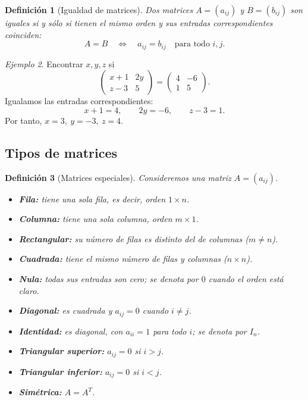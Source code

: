 \documentclass[12pt]{article}
\newtheorem{definicion}{Definición}[section]
\theoremstyle{remark}
\newtheorem{ejemplo}[definicion]{Ejemplo}
\begin{document}
\begin{definicion}[Igualdad de matrices]
Dos matrices $A=(a_{ij})$ y $B=(b_{ij})$ son iguales si y sólo si tienen el mismo orden y sus entradas correspondientes coinciden:
\[
A=B\quad\Longleftrightarrow\quad a_{ij}=b_{ij}\quad\text{para todo }i,j.
\]
\end{definicion}

\begin{ejemplo}
Encontrar $x,y,z$ si
\[
\begin{pmatrix}x+1&2y\\z-3&5\end{pmatrix}=
\begin{pmatrix}4&-6\\1&5\end{pmatrix}.
\]
Igualamos las entradas correspondientes:
\[
x+1=4,\qquad 2y=-6,\qquad z-3=1.
\]
Por tanto, $\boxed{x=3,\ y=-3,\ z=4}$.
\end{ejemplo}

\subsection{Tipos de matrices}
\begin{definicion}[Matrices especiales]
Consideremos una matriz $A=(a_{ij})$.
\begin{itemize}
\item \textbf{Fila:} tiene una sola fila, es decir, orden $1\times n$.
\item \textbf{Columna:} tiene una sola columna, orden $m\times1$.
\item \textbf{Rectangular:} su número de filas es distinto del de columnas ($m\ne n$).
\item \textbf{Cuadrada:} tiene el mismo número de filas y columnas ($n\times n$).
\item \textbf{Nula:} todas sus entradas son cero; se denota por $0$ cuando el orden está claro.
\item \textbf{Diagonal:} es cuadrada y $a_{ij}=0$ cuando $i\ne j$.
\item \textbf{Identidad:} es diagonal, con $a_{ii}=1$ para todo $i$; se denota por $I_n$.
\item \textbf{Triangular superior:} $a_{ij}=0$ si $i>j$.
\item \textbf{Triangular inferior:} $a_{ij}=0$ si $i<j$.
\item \textbf{Simétrica:} $A=A^T$.
\end{itemize}
\end{definicion}
\end{document}
